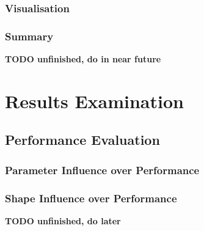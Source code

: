 \documentclass[12pt, oneside]{report}
\begin{document}
\subsection{Visualisation}
\subsection{Summary}

{\bf TODO unfinished, do in near future}


\chapter{Results Examination}
\section{Performance Evaluation}
\subsection{Parameter Influence over Performance}
\subsection{Shape Influence over Performance}
{\bf TODO unfinished, do later}


\newpage
\printbibliography
\end{document}
